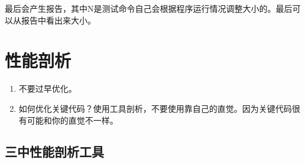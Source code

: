 \begin{Shaded}
\begin{Highlighting}[]
 
\NormalTok{)}
\NormalTok{  \}}
\NormalTok{\}}
\end{Highlighting}
\end{Shaded}

\begin{Shaded}
\begin{Highlighting}[]
\end{Highlighting}
\end{Shaded}

最后会产生报告，其中N是测试命令自己会根据程序运行情况调整大小的。最后可以从报告中看出来大小。

\hypertarget{ux6027ux80fdux5256ux6790}{%
\section{性能剖析}\label{ux6027ux80fdux5256ux6790}}

\begin{enumerate}
\tightlist
\item
  不要过早优化。
\item
  如何优化关键代码？使用工具剖析，不要使用靠自己的直觉。因为关键代码很有可能和你的直觉不一样。
\end{enumerate}

\hypertarget{ux4e09ux4e2dux6027ux80fdux5256ux6790ux5de5ux5177}{%
\subsection{三中性能剖析工具}\label{ux4e09ux4e2dux6027ux80fdux5256ux6790ux5de5ux5177}}

\begin{Shaded}
\begin{Highlighting}[]
\NormalTok{$ }
\NormalTok{$ }
\NormalTok{$ }
\end{Highlighting}
\end{Shaded}

